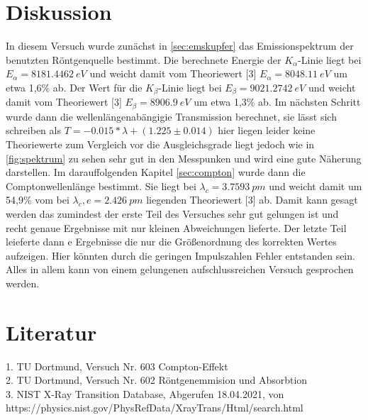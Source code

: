 \section{Diskussion}
\label{sec:diskussion}
In diesem Versuch wurde zunächst in \autoref{sec:emskupfer} das Emissionspektrum der
benutzten Röntgenquelle bestimmt. Die berechnete Energie der $K_{\alpha}$-Linie liegt bei
$E_{\alpha}=\SI[]{8181.4462}[]{eV}$ und weicht damit vom Theoriewert [3] $E_{\alpha}=\SI[]{8048.11}[]{eV}$
um etwa 1,6\% ab. Der Wert für die $K_{\beta}$-Linie liegt bei $E_{\beta}=\SI[]{9021.2742}[]{eV}$ 
und weicht damit vom Theoriewert [3] $E_{\beta}=\SI[]{8906.9}[]{eV}$ 
um etwa 1,3\% ab. Im nächsten Schritt wurde dann die wellenlängenabängigie Transmission
berechnet, sie lässt sich schreiben als $T=-0.015*\lambda+(1.225 \pm 0.014)$ hier liegen leider
keine Theoriewerte zum Vergleich vor die Ausgleichsgrade liegt jedoch wie in \autoref{fig:spektrum}
zu sehen sehr gut in den Messpunken und wird eine gute Näherung darstellen. Im darauffolgenden Kapitel
\autoref{sec:compton} wurde dann die Comptonwellenlänge bestimmt. Sie liegt bei $\lambda_c=\SI[]{3.7593}[]{pm}$
und weicht damit um 54,9\% vom bei $\lambda_c,e=\SI[]{2.426}[]{pm}$ liegenden Theoriewert [3] ab.
Damit kann gesagt werden das zumindest der erste Teil des Versuches sehr gut gelungen ist und
recht genaue Ergebnisse mit nur kleinen Abweichungen lieferte. Der letzte Teil leieferte dann e
Ergebnisse die nur die Größenordnung des korrekten Wertes aufzeigen. Hier könnten durch die geringen 
Impulszahlen Fehler entstanden sein. Alles in allem kann von einem gelungenen aufschlussreichen 
Versuch gesprochen werden.

\section{Literatur}
1. TU Dortmund, Versuch Nr. 603 Compton-Effekt \\
2. TU Dortmund, Versuch Nr. 602 Röntgenemmision und Absorbtion\\
3. NIST X-Ray Transition Database, Abgerufen 18.04.2021, von https://physics.nist.gov/PhysRefData/XrayTrans/Html/search.html \\